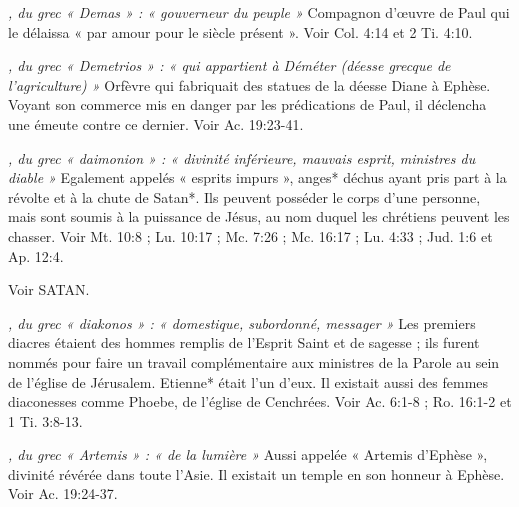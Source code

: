 \begin{multicols}{2}
{\textit{, du grec « Demas » : « gouverneur du peuple »}\newline
Compagnon d'œuvre de Paul qui le délaissa « par amour pour le siècle présent ». Voir Col. 4:14 et 2 Ti. 4:10.

\textit{, du grec « Demetrios » : « qui appartient à Déméter (déesse grecque de l'agriculture) »}\newline
Orfèvre qui fabriquait des statues de la déesse Diane à Ephèse. Voyant son commerce mis en danger par les prédications de Paul, il déclencha une émeute contre ce dernier. Voir Ac. 19:23-41.

\textit{, du grec « daimonion » : « divinité inférieure, mauvais esprit, ministres du diable »}\newline
Egalement appelés « esprits impurs », anges* déchus ayant pris part à la révolte et à la chute de Satan*. Ils peuvent posséder le corps d'une personne, mais sont soumis à la puissance de Jésus, au nom duquel les chrétiens peuvent les chasser. Voir Mt. 10:8 ; Lu. 10:17 ; Mc. 7:26 ; Mc. 16:17 ; Lu. 4:33 ; Jud. 1:6 et Ap. 12:4.

\textit{}\newline
Voir SATAN.

\textit{, du grec « diakonos » : « domestique, subordonné, messager »}\newline
Les premiers diacres étaient des hommes remplis de l'Esprit Saint et de sagesse ; ils furent nommés pour faire un travail complémentaire aux ministres de la Parole au sein de l'église de Jérusalem. Etienne* était l'un d'eux. Il existait aussi des femmes diaconesses comme Phoebe, de l'église de Cenchrées. Voir Ac. 6:1-8 ; Ro. 16:1-2 et 1 Ti. 3:8-13.

\textit{, du grec « Artemis » : « de la lumière »}\newline
Aussi appelée « Artemis d'Ephèse », divinité révérée dans toute l'Asie. Il existait un temple en son honneur à Ephèse. Voir Ac. 19:24-37.

}
\end{multicols}
